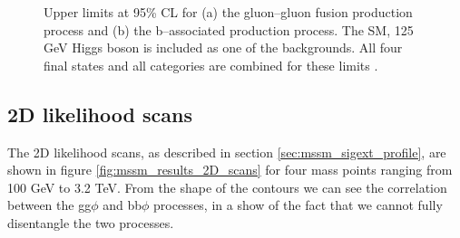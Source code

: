 \begin{figure}[h!]
\begin{center}
\end{center}
\caption{Upper limits at 95\% CL for (a) the gluon--gluon fusion production
process and (b) the b--associated production process. The SM, 125 GeV Higgs boson
is included as one of the backgrounds. All four final states and 
all categories are combined for these limits \cite{CMS-PAS-HIG-16-037-addit}.}
\label{fig:mssm_results_greenband}
\end{figure}


\subsection{2D likelihood scans}
\label{sec:mssm_results_2D}
The 2D likelihood scans, as described in section \ref{sec:mssm_sigext_profile},
are shown in figure \ref{fig:mssm_results_2D_scans}
for four mass points ranging from 100 GeV to 3.2 TeV. From the shape of the contours
we can see the correlation between the gg$\phi$ and bb$\phi$ processes, in a show of
the fact that we cannot fully disentangle the two processes.

